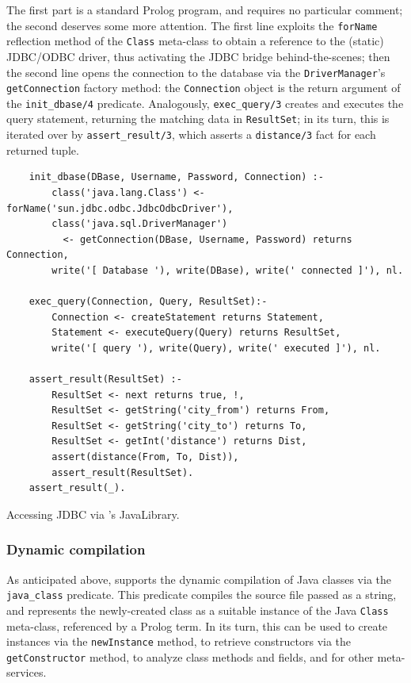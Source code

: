 The first part is a standard Prolog program, and requires no particular comment; the second deserves some more attention. The first line exploits the \texttt{forName} reflection method of the \texttt{Class} meta-class to obtain a reference to the (static) JDBC/ODBC driver, thus activating the JDBC bridge behind-the-scenes; then the second line opens the connection to the database via the \texttt{DriverManager}'s \texttt{getConnection} factory method: the \texttt{Connection} object is the return argument of the \texttt{init\_dbase/4} predicate.
Analogously, \texttt{exec\_query/3} creates and executes the query statement, returning the matching data in \texttt{ResultSet}; in its turn, this is iterated over by \texttt{assert\_result/3}, which asserts a \texttt{distance/3} fact for each returned tuple.

\begin{table}
\small
\begin{verbatim}
    init_dbase(DBase, Username, Password, Connection) :-
        class('java.lang.Class') <- forName('sun.jdbc.odbc.JdbcOdbcDriver'),
        class('java.sql.DriverManager')
          <- getConnection(DBase, Username, Password) returns Connection,
        write('[ Database '), write(DBase), write(' connected ]'), nl.

    exec_query(Connection, Query, ResultSet):-
        Connection <- createStatement returns Statement,
        Statement <- executeQuery(Query) returns ResultSet,
        write('[ query '), write(Query), write(' executed ]'), nl.

    assert_result(ResultSet) :-
        ResultSet <- next returns true, !,
        ResultSet <- getString('city_from') returns From,
        ResultSet <- getString('city_to') returns To,
        ResultSet <- getInt('distance') returns Dist,
        assert(distance(From, To, Dist)),
        assert_result(ResultSet).
    assert_result(_).
\end{verbatim}
\caption{Accessing JDBC via \tuprolog{}'s JavaLibrary.}
\label{tab:jdbc-example-part2}
\end{table}

\subsubsection{Dynamic compilation}

As anticipated above, \tuprolog{} supports the dynamic compilation of Java classes via the \texttt{java\_class} predicate. This predicate compiles the source file passed as a string, and represents the newly-created class as a suitable instance of the Java \texttt{Class} meta-class, referenced by a Prolog term.
%
In its turn, this can be used to create instances via the \texttt{newInstance}
method, to retrieve constructors via the \texttt{getConstructor} method, to analyze class methods and fields, and for other meta-services.

